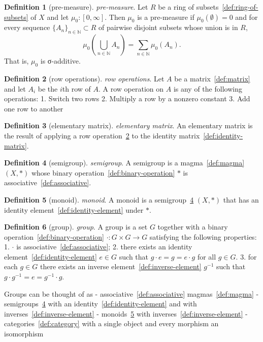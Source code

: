 \documentclass[12pt,a4paper]{article}
\theoremstyle{definition}
\newtheorem{definition}{Definition}
\begin{document}
\begin{definition}[pre-measure]\label{def:pre-measure}
\emph{pre-measure}. Let $R$ be a ring of subsets~\ref{def:ring-of-subsets} of $X$ and let $\mu_0:[0,\infty]$. Then $\mu_0$ is a pre-measure if $\mu_0(\emptyset) = 0$ and for every sequence $\{A_n\}_{n\in\mathbb N}\subset R$ of pairwise disjoint subsets whose union is in $R$, $$\mu_0\left(\bigcup_{n\in\mathbb N}A_n\right) = \sum_{n\in\mathbb N} \mu_0(A_n).$$ That is, $\mu_0$ is σ-additive.
\end{definition}

\begin{definition}[row operations]\label{def:row-operations}
\emph{row operations}. Let $A$ be a matrix~\ref{def:matrix} and let $A_i$ be the $i$th row of $A$. A row operation on $A$ is any of the following operations:
1. Switch two rows
2. Multiply a row by a nonzero constant
3. Add one row to another
\end{definition}

\begin{definition}[elementary matrix]\label{def:elementary-matrix}
\emph{elementary matrix}. An elementary matrix is the result of applying a row operation~\ref{def:row-operations} to the identity matrix~\ref{def:identity-matrix}.
\end{definition}

\begin{definition}[semigroup]\label{def:semigroup}
\emph{semigroup}. A semigroup is a magma~\ref{def:magma} $(X,*)$ whose binary operation~\ref{def:binary-operation} $*$ is associative~\ref{def:associative}.
\end{definition}

\begin{definition}[monoid]\label{def:monoid}
\emph{monoid}. A monoid is a semigroup~\ref{def:semigroup} $(X,*)$ that has an identity element~\ref{def:identity-element} under $*$.
\end{definition}

\begin{definition}[group]\label{def:group}
\emph{group}. A group is a set $G$ together with a binary operation~\ref{def:binary-operation} $\cdot:G\times G \to G$ satisfying the following properties:
1. $\cdot$ is associative~\ref{def:associative};
2. there exists an identity element~\ref{def:identity-element} $e \in G$ such that $g\cdot e = g = e\cdot g$ for all $g \in G$.
3. for each $g \in G$ there exists an inverse element~\ref{def:inverse-element} $g^{-1}$ such that $g\cdot g^{-1} = e = g^{-1}\cdot g$.



Groups can be thought of as 
- associative~\ref{def:associative} magmas~\ref{def:magma}
- semigroups~\ref{def:semigroup} with an identity~\ref{def:identity-element} and with inverses~\ref{def:inverse-element}
- monoids~\ref{def:monoid} with inverses~\ref{def:inverse-element}
- categories~\ref{def:category} with a single object and every morphism an isomorphism
\end{definition}
\end{document}
